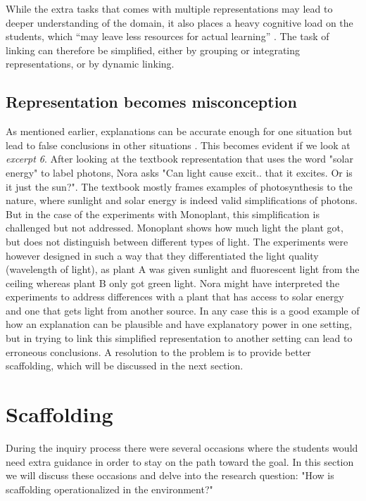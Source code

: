 While the extra tasks that comes with multiple representations may lead to deeper understanding of the domain, it also places a heavy cognitive load on the students, which “may leave less resources for actual learning” \citetext{Sweller, 1988, 1989, referenced in \citealp{van2006supporting}}. The task of linking can therefore be simplified, either by grouping or integrating representations, or by dynamic linking. 

\subsection{Representation becomes misconception}
As mentioned earlier, explanations can be accurate enough for one situation but lead to false conclusions in other situations \citep{smith1994misconceptions}. This becomes evident if we look at \emph{excerpt 6}. After looking at the textbook representation that uses the word "solar energy" to label photons, Nora asks "Can light cause excit.. that it excites. Or is it just the sun?". The textbook mostly frames examples of photosynthesis to the nature, where sunlight and solar energy is indeed valid simplifications of photons. But in the case of the experiments with Monoplant, this simplification is challenged but not addressed. Monoplant shows how much light the plant got, but does not distinguish between different types of light. The experiments were however designed in such a way that they differentiated the light quality (wavelength of light), as plant A was given sunlight and fluorescent light from the ceiling whereas plant B only got green light. Nora might have interpreted the experiments to address differences with a plant that has access to solar energy and one that gets light from another source. In any case this is a good example of how an explanation can be plausible and have explanatory power in one setting, but in trying to link this simplified representation to another setting can lead to erroneous conclusions. A resolution to the problem is to provide better scaffolding, which will be discussed in the next section.

\section{Scaffolding}
During the inquiry process there were several occasions where the students would need extra guidance in order to stay on the path toward the goal. In this section we will discuss these occasions and delve into the research question: "How is scaffolding operationalized in the environment?"


